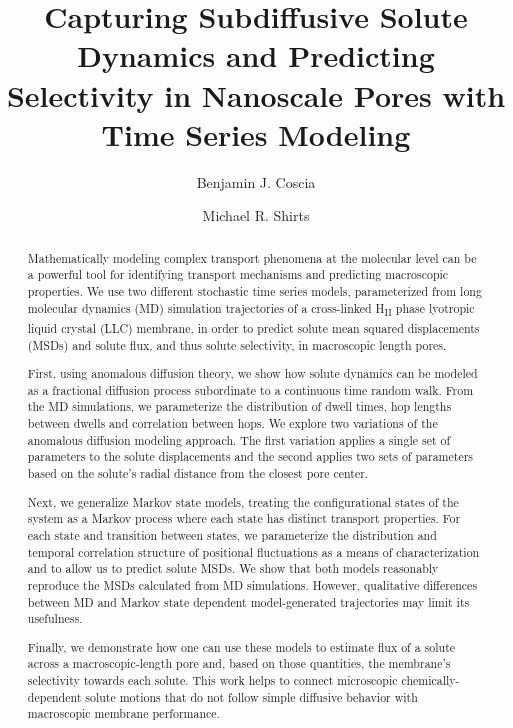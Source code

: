 \documentclass[journal=ancac3,manuscript=article,layout=twocolumn]{achemso}
\title{Capturing Subdiffusive Solute Dynamics and Predicting Selectivity in Nanoscale Pores with Time Series Modeling}
\author{Benjamin J. Coscia}
\affiliation{Department of Chemical and Biological Engineering, University of Colorado Boulder, Boulder, CO 80309, USA}
\author{Michael R. Shirts}
\affiliation{Department of Chemical and Biological Engineering, University of Colorado Boulder, Boulder, CO 80309, USA}
\begin{document}
%  
%  
%
  
  \begin{abstract}
  
  Mathematically modeling complex transport phenomena at the molecular level 
  can be a powerful tool for identifying transport mechanisms and predicting
  macroscopic properties. We use two different stochastic time series models,
  parameterized from long molecular dynamics (MD) simulation trajectories of
  a cross-linked H\textsubscript{II} phase lyotropic liquid crystal (LLC) 
  membrane, in order to predict solute mean squared displacements (MSDs) 
  and solute flux, and thus solute selectivity, in macroscopic length pores. 

  First, using anomalous diffusion theory, we show how solute dynamics can be
  modeled as a fractional diffusion process subordinate to a continuous time 
  random walk. From the MD simulations, we parameterize the distribution of 
  dwell times, hop lengths between dwells and correlation between hops. We 
  explore two variations of the anomalous diffusion modeling approach. The first variation
  applies a single set of parameters to the solute displacements and the second
  applies two sets of parameters based on the solute's radial distance from the
  closest pore center. 

  Next, we generalize Markov state models, treating the
  configurational states of the system as a Markov process where each
  state has distinct transport properties. For each state and transition
  between states, we parameterize the distribution and temporal correlation 
  structure of positional fluctuations as a means of characterization and to 
  allow us to predict solute MSDs. We show that both models reasonably reproduce
  the MSDs calculated from MD simulations. However, qualitative differences 
  between MD and Markov state dependent model-generated trajectories may limit 
  its usefulness. 

  Finally, we demonstrate how one can use these models to 
  estimate flux of a solute across a macroscopic-length pore and, based on 
  those quantities, the membrane's selectivity towards each solute. This work 
  helps to connect microscopic chemically-dependent solute motions that do not
  follow simple diffusive behavior with macroscopic membrane performance.

  \end{abstract}
\end{document}
